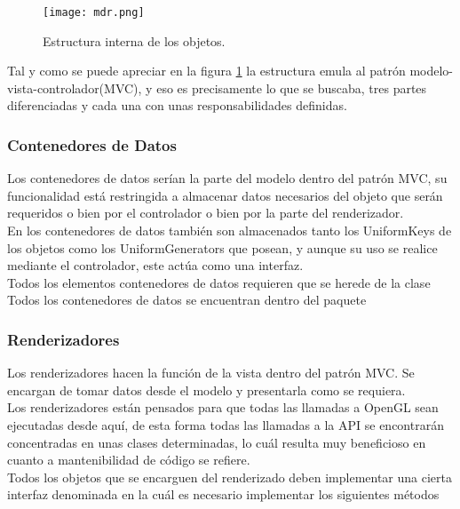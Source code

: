 \begin{figure}[h!]
\begin{center}
\texttt{[image: mdr.png]}
\end{center}
\caption[Estructura interna de los objetos]{Estructura interna de los objetos.}
\label{fig:mdr}
\end{figure}

Tal y como se puede apreciar en la figura \ref{fig:mdr} la estructura emula al patrón modelo-vista-controlador(MVC), y eso es precisamente lo que se buscaba, tres partes diferenciadas y cada una con unas responsabilidades definidas.

\subsubsection{Contenedores de Datos}
Los contenedores de datos serían la parte del modelo dentro del patrón MVC, su funcionalidad está restringida a almacenar datos necesarios del objeto que serán requeridos o bien por el controlador o bien por la parte del renderizador.\\
En los contenedores de datos también son almacenados tanto los UniformKeys de los objetos como los UniformGenerators que posean, y aunque su uso se realice mediante el controlador, este actúa como una interfaz.\\
Todos los elementos contenedores de datos requieren que se herede de la clase \rorefobjectdata\\
Todos los contenedores de datos se encuentran dentro del paquete 
\subsubsection{Renderizadores}
Los renderizadores hacen la función de la vista dentro del patrón MVC. Se encargan de tomar datos desde el modelo y presentarla como se requiera.\\
Los renderizadores están pensados para que todas las llamadas a OpenGL sean ejecutadas desde aquí, de esta forma todas las llamadas a la API se encontrarán concentradas en unas clases determinadas, lo cuál resulta muy beneficioso en cuanto a mantenibilidad de código se refiere.\\
Todos los objetos que se encarguen del renderizado deben implementar una cierta interfaz denominada \rorefobjectrender en la cuál es necesario implementar los siguientes métodos

